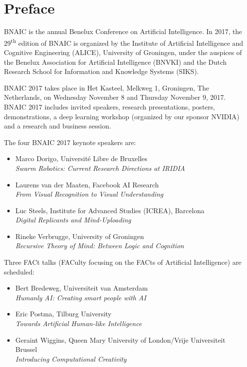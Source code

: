 \section*{Preface}

BNAIC is the annual Benelux Conference on Artificial Intelligence. In 2017, the 29\textsuperscript{th} edition of BNAIC is organized by the Institute of Artificial Intelligence and Cognitive Engineering (ALICE), University of Groningen, under the auspices of the Benelux Association for Artificial Intelligence (BNVKI) and the Dutch Research School for Information and Knowledge Systems (SIKS).

BNAIC 2017 takes place in Het Kasteel, Melkweg 1, Groningen, The Netherlands, on Wednesday November 8 and Thursday November 9, 2017. BNAIC 2017 includes invited speakers, research presentations, posters, demonstrations, a deep learning workshop (organized by our sponsor NVIDIA) and a research and business session. 

The four BNAIC 2017 keynote speakers are:

\begin{itemize}
	\item 
Marco Dorigo, Universit\'{e} Libre de Bruxelles\\
\emph{Swarm Robotics: Current Research Directions at IRIDIA}

	\item 
Laurens van der Maaten, Facebook AI Research\\
\emph{From Visual Recognition to Visual Understanding}

	\item 
Luc Steels, Institute for Advanced Studies (ICREA), Barcelona\\
\emph{Digital Replicants and Mind-Uploading
}

	\item 
Rineke Verbrugge, University of Groningen\\
\emph{Recursive Theory of Mind: Between Logic and Cognition}
\end{itemize}

\noindent Three FACt talks (FACulty focusing on the FACts of Artificial Intelligence) are scheduled:

\begin{itemize}
	\item 
Bert Bredeweg, Universiteit van Amsterdam\\
\emph{Humanly AI: Creating smart people with AI}
	\item Eric Postma, Tilburg University\\
\emph{Towards Artificial Human-like Intelligence}
	\item Geraint Wiggins, Queen Mary University of London/Vrije Universiteit Brussel\\
\emph{Introducing Computational Creativity}
\end{itemize}

